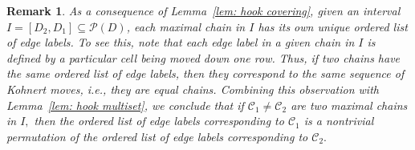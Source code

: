 \documentclass[letterpaper,10pt]{article}
\newtheorem{remark}[theorem]{Remark}
\begin{document}
\begin{remark}\label{rem:unique}
As a consequence of Lemma~\ref{lem: hook covering}, given an interval $I=[D_2,D_1]\subseteq\mathcal{P}(D)$, each maximal chain in $I$ has its own unique ordered list of edge labels. To see this, note that each edge label in a given chain in $I$ is defined by a particular cell being moved down one row. Thus, if two chains have the same ordered list of edge labels, then they correspond to the same sequence of Kohnert moves, i.e., they are equal chains. Combining this observation with Lemma~\ref{lem: hook multiset}, we conclude that if $\mathcal{C}_1\neq\mathcal{C}_2$ are two maximal chains in $I,$ then the ordered list of edge labels corresponding to $\mathcal{C}_1$ is a nontrivial permutation of the ordered list of edge labels corresponding to $\mathcal{C}_2.$
\end{remark}
\end{document}
